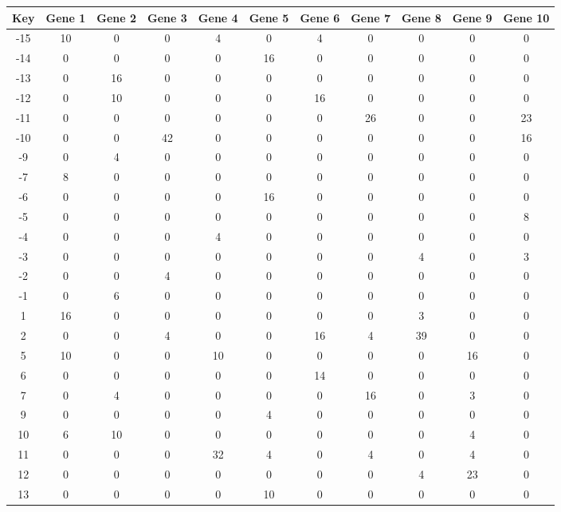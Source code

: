 \begin{tabular}{|c|c|c|c|c|c|c|c|c|c|c|}
\hline
Key & Gene 1 & Gene 2 & Gene 3 & Gene 4 & Gene 5 & Gene 6 & Gene 7 & Gene 8 & Gene 9 & Gene 10 \\
\hline
-15 & 10 & 0 & 0 & 4 & 0 & 4 & 0 & 0 & 0 & 0 \\
-14 & 0 & 0 & 0 & 0 & 16 & 0 & 0 & 0 & 0 & 0 \\
-13 & 0 & 16 & 0 & 0 & 0 & 0 & 0 & 0 & 0 & 0 \\
-12 & 0 & 10 & 0 & 0 & 0 & 16 & 0 & 0 & 0 & 0 \\
-11 & 0 & 0 & 0 & 0 & 0 & 0 & 26 & 0 & 0 & 23 \\
-10 & 0 & 0 & 42 & 0 & 0 & 0 & 0 & 0 & 0 & 16 \\
-9 & 0 & 4 & 0 & 0 & 0 & 0 & 0 & 0 & 0 & 0 \\
-7 & 8 & 0 & 0 & 0 & 0 & 0 & 0 & 0 & 0 & 0 \\
-6 & 0 & 0 & 0 & 0 & 16 & 0 & 0 & 0 & 0 & 0 \\
-5 & 0 & 0 & 0 & 0 & 0 & 0 & 0 & 0 & 0 & 8 \\
-4 & 0 & 0 & 0 & 4 & 0 & 0 & 0 & 0 & 0 & 0 \\
-3 & 0 & 0 & 0 & 0 & 0 & 0 & 0 & 4 & 0 & 3 \\
-2 & 0 & 0 & 4 & 0 & 0 & 0 & 0 & 0 & 0 & 0 \\
-1 & 0 & 6 & 0 & 0 & 0 & 0 & 0 & 0 & 0 & 0 \\
1 & 16 & 0 & 0 & 0 & 0 & 0 & 0 & 3 & 0 & 0 \\
2 & 0 & 0 & 4 & 0 & 0 & 16 & 4 & 39 & 0 & 0 \\
5 & 10 & 0 & 0 & 10 & 0 & 0 & 0 & 0 & 16 & 0 \\
6 & 0 & 0 & 0 & 0 & 0 & 14 & 0 & 0 & 0 & 0 \\
7 & 0 & 4 & 0 & 0 & 0 & 0 & 16 & 0 & 3 & 0 \\
9 & 0 & 0 & 0 & 0 & 4 & 0 & 0 & 0 & 0 & 0 \\
10 & 6 & 10 & 0 & 0 & 0 & 0 & 0 & 0 & 4 & 0 \\
11 & 0 & 0 & 0 & 32 & 4 & 0 & 4 & 0 & 4 & 0 \\
12 & 0 & 0 & 0 & 0 & 0 & 0 & 0 & 4 & 23 & 0 \\
13 & 0 & 0 & 0 & 0 & 10 & 0 & 0 & 0 & 0 & 0 \\
\hline
\end{tabular}